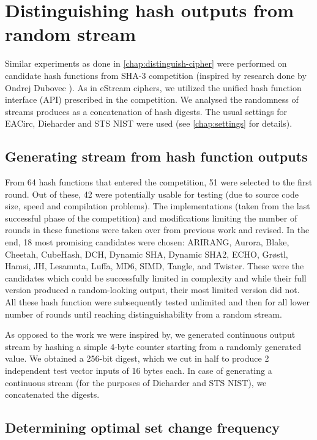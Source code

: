 \documentclass[12pt,oneside]{fithesis2}		%
\renewcommand{\_}{\leavevmode \kern0.0em\vbox{\hrule width0.4em}}
\begin{document}
\chapter{Distinguishing hash outputs from random stream}
\label{chap:distinguish-hash}

Similar experiments as done in \autoref{chap:distinguish-cipher} were performed on candidate hash functions from SHA-3 competition
\parencite{sha3-competition}
(inspired by research done by Ondrej Dubovec \parencite{thesis-dubovec}).
As in eStream ciphers, we utilized the unified hash function interface (API) prescribed in the competition.
We analysed the randomness of streams produces as a concatenation of hash digests.
The usual settings for EACirc, Dieharder and STS NIST were used (see \autoref{chap:settings} for details).

\section{Generating stream from hash function outputs}
\label{sec:hash-settings}

From 64 hash functions that entered the competition, 51 were selected to the first round. 
Out of these, 42 were potentially usable for testing (due to source code size, speed and compilation problems).
The implementations (taken from the last successful phase of the competition) and
modifications limiting the number of rounds in these functions were taken over from previous work \parencite{thesis-dubovec}
and revised. In the end, 18 most promising candidates were chosen: ARIRANG, Aurora, Blake, Cheetah, CubeHash, DCH, 
Dynamic SHA, Dynamic SHA2, ECHO, Grøstl, Hamsi, JH, Lesamnta, Luffa, MD6, SIMD, Tangle, and Twister.
These were the candidates which could be successfully limited in complexity and while their full version produced a random-looking
output, their most limited version did not. All these hash function were subsequently tested unlimited and
then for all lower number of rounds until reaching distinguishability from a random stream.

As opposed to the work we were inspired by, we generated continuous output stream by hashing a simple 4-byte counter starting
from a randomly generated value. We obtained a 256-bit digest, which we cut in half to produce 2 independent test vector inputs
of 16 bytes each. In case of generating a continuous stream (for the purposes of Dieharder and STS NIST), we concatenated 
the digests.

\section{Determining optimal set change frequency}
\label{sec:hash-set-change-freqency}
\end{document}
